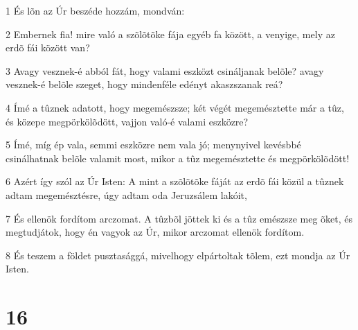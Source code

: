 \par 1 És lõn az Úr beszéde hozzám, mondván:
\par 2 Embernek fia! mire való a szõlõtõke fája egyéb fa között, a venyige, mely az erdõ fái között van?
\par 3 Avagy vesznek-é abból fát, hogy valami eszközt csináljanak belõle? avagy vesznek-é belõle szeget, hogy mindenféle edényt akaszszanak reá?
\par 4 Ímé a tûznek adatott, hogy megemészsze; két végét megemésztette már a tûz, és közepe megpörkölõdött, vajjon való-é valami eszközre?
\par 5 Ímé, míg ép vala, semmi eszközre nem vala jó; menynyivel kevésbbé csinálhatnak belõle valamit most, mikor a tûz megemésztette és megpörkölõdött!
\par 6 Azért így szól az Úr Isten: A mint a szõlõtõke fáját az erdõ fái közül a tûznek adtam megemésztésre, úgy adtam oda Jeruzsálem lakóit,
\par 7 És ellenök fordítom arczomat. A tûzbõl jöttek ki és a tûz emészsze meg õket, és megtudjátok, hogy én vagyok az Úr, mikor arczomat ellenök fordítom.
\par 8 És teszem a földet pusztasággá, mivelhogy elpártoltak tõlem, ezt mondja az Úr Isten.

\chapter{16}

